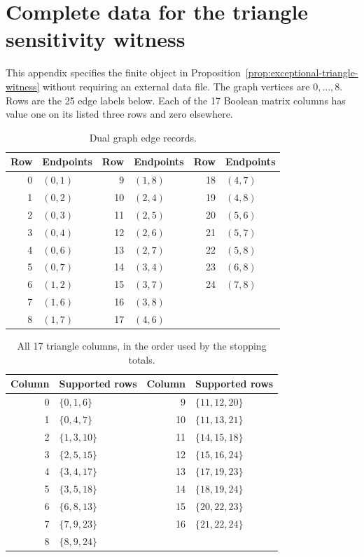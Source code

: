 \section{Complete data for the triangle sensitivity witness}
\label{app:triangle-data}

This appendix specifies the finite object in
Proposition~\ref{prop:exceptional-triangle-witness} without requiring an
external data file.  The graph vertices are $0,\ldots,8$.  Rows are the
25 edge labels below.  Each of the 17 Boolean matrix columns has value
one on its listed three rows and zero elsewhere.

\begin{table}[htbp]
\centering\small
\begin{tabular}{rl@{\qquad}rl@{\qquad}rl}
\toprule
Row & Endpoints & Row & Endpoints & Row & Endpoints\\
\midrule
0 & $(0,1)$ & 9 & $(1,8)$ & 18 & $(4,7)$\\
1 & $(0,2)$ & 10 & $(2,4)$ & 19 & $(4,8)$\\
2 & $(0,3)$ & 11 & $(2,5)$ & 20 & $(5,6)$\\
3 & $(0,4)$ & 12 & $(2,6)$ & 21 & $(5,7)$\\
4 & $(0,6)$ & 13 & $(2,7)$ & 22 & $(5,8)$\\
5 & $(0,7)$ & 14 & $(3,4)$ & 23 & $(6,8)$\\
6 & $(1,2)$ & 15 & $(3,7)$ & 24 & $(7,8)$\\
7 & $(1,6)$ & 16 & $(3,8)$ &  & \\
8 & $(1,7)$ & 17 & $(4,6)$ &  & \\
\bottomrule
\end{tabular}
\caption{Dual graph edge records.}
\end{table}

\begin{table}[htbp]
\centering\small
\begin{tabular}{rl@{\qquad}rl}
\toprule
Column & Supported rows & Column & Supported rows\\
\midrule
0 & $\{0,1,6\}$ & 9 & $\{11,12,20\}$\\
1 & $\{0,4,7\}$ & 10 & $\{11,13,21\}$\\
2 & $\{1,3,10\}$ & 11 & $\{14,15,18\}$\\
3 & $\{2,5,15\}$ & 12 & $\{15,16,24\}$\\
4 & $\{3,4,17\}$ & 13 & $\{17,19,23\}$\\
5 & $\{3,5,18\}$ & 14 & $\{18,19,24\}$\\
6 & $\{6,8,13\}$ & 15 & $\{20,22,23\}$\\
7 & $\{7,9,23\}$ & 16 & $\{21,22,24\}$\\
8 & $\{8,9,24\}$ &  & \\
\bottomrule
\end{tabular}
\caption{All 17 triangle columns, in the order used by the stopping totals.}
\end{table}

